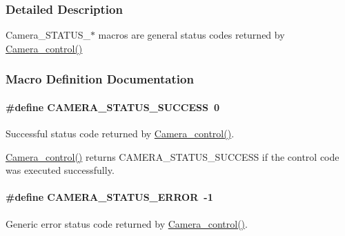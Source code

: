 \subsubsection{Detailed Description}
Camera\+\_\+\+S\+T\+A\+T\+U\+S\+\_\+$\ast$ macros are general status codes returned by \hyperlink{_camera_8h_adfc7e9a60daa499220296a238a09b393}{Camera\+\_\+control()} 

\subsubsection{Macro Definition Documentation}
\paragraph[{C\+A\+M\+E\+R\+A\+\_\+\+S\+T\+A\+T\+U\+S\+\_\+\+S\+U\+C\+C\+E\+S\+S}]{\setlength{\rightskip}{0pt plus 5cm}\#define C\+A\+M\+E\+R\+A\+\_\+\+S\+T\+A\+T\+U\+S\+\_\+\+S\+U\+C\+C\+E\+S\+S~0}\label{group___camera___s_t_a_t_u_s_gaa4d73b4da4ce113c8fb545d1f2649257}


Successful status code returned by \hyperlink{_camera_8h_adfc7e9a60daa499220296a238a09b393}{Camera\+\_\+control()}. 

\hyperlink{_camera_8h_adfc7e9a60daa499220296a238a09b393}{Camera\+\_\+control()} returns C\+A\+M\+E\+R\+A\+\_\+\+S\+T\+A\+T\+U\+S\+\_\+\+S\+U\+C\+C\+E\+S\+S if the control code was executed successfully. 
\paragraph[{C\+A\+M\+E\+R\+A\+\_\+\+S\+T\+A\+T\+U\+S\+\_\+\+E\+R\+R\+O\+R}]{\setlength{\rightskip}{0pt plus 5cm}\#define C\+A\+M\+E\+R\+A\+\_\+\+S\+T\+A\+T\+U\+S\+\_\+\+E\+R\+R\+O\+R~-\/1}\label{group___camera___s_t_a_t_u_s_ga2863402eca66d26cf447fc02340a0d45}


Generic error status code returned by \hyperlink{_camera_8h_adfc7e9a60daa499220296a238a09b393}{Camera\+\_\+control()}. 

